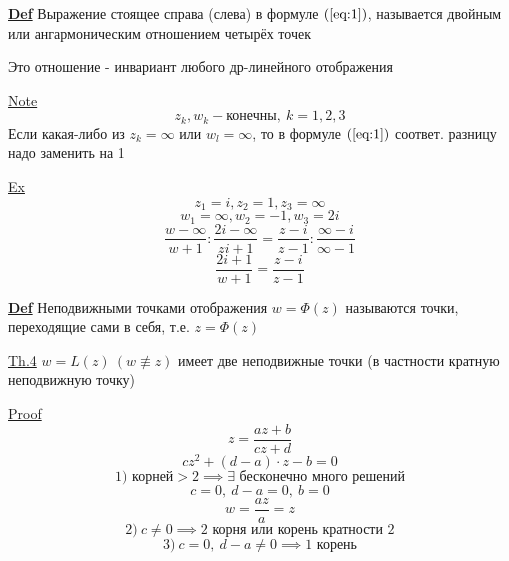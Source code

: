 \documentclass[a4paper]{article}
\begin{document}
\begin{tcolorbox}
\textbf{\underline{Def}} Выражение стоящее справа (слева) в формуле $ (\ref{eq:1}) $,
называется двойным или ангармоническим отношением четырёх точек

Это отношение - инвариант любого др-линейного отображения
\end{tcolorbox}

\underline{Note} 
\[
    z_k, w_k - \text{конечны}, \ k = 1,2,3
\]
Если какая-либо из $ z_k = \infty $ или $ w_l = \infty $, то в формуле $ (\ref{eq:1}) $ 
соответ. разницу надо заменить на 1

\underline{Ex}
\[
    z_1 = i, z_2 = 1, z_3 = \infty
\]
\[
    w_1 = \infty, w_2 = -1, w_3 = 2i
\]
\[
    \frac{w - \infty}{w + 1} : \frac{2i - \infty}{zi + 1} = 
    \frac{z - i}{z - 1} : \frac{\infty - i}{\infty - 1} 
\]
\[
    \frac{2i + 1}{w + 1} = \frac{z - i}{z - 1} 
\]

\textbf{\underline{Def}} Неподвижными точками отображения $ w = \Phi(z) $ называются
точки, переходящие сами в себя, т.е. $ z = \Phi(z) $ 

\begin{tcolorbox}
\underline{Th.4} $ w = L(z)\ (w \not\equiv z) $ имеет две неподвижные точки (в
частности кратную неподвижную точку)

\underline{Proof}
\[
    z = \frac{az + b}{cz + d} 
\]
\[
    cz^2 + (d-a)\cdot z - b = 0
\]
\[
    1) \text{ корней} > 2 \implies \exists \text{ бесконечно много решений}
\]
\[
    c = 0, \ d-a = 0, \ b = 0
\]
\[
    w = \frac{az}{a} = z
\]
\[
    2) \ c \neq 0 \implies \text{2 корня или корень кратности 2}
\]
\[
    3) \ c = 0, \ d - a \neq 0 \implies \text{1 корень}
\]
\end{tcolorbox}
\end{document}

